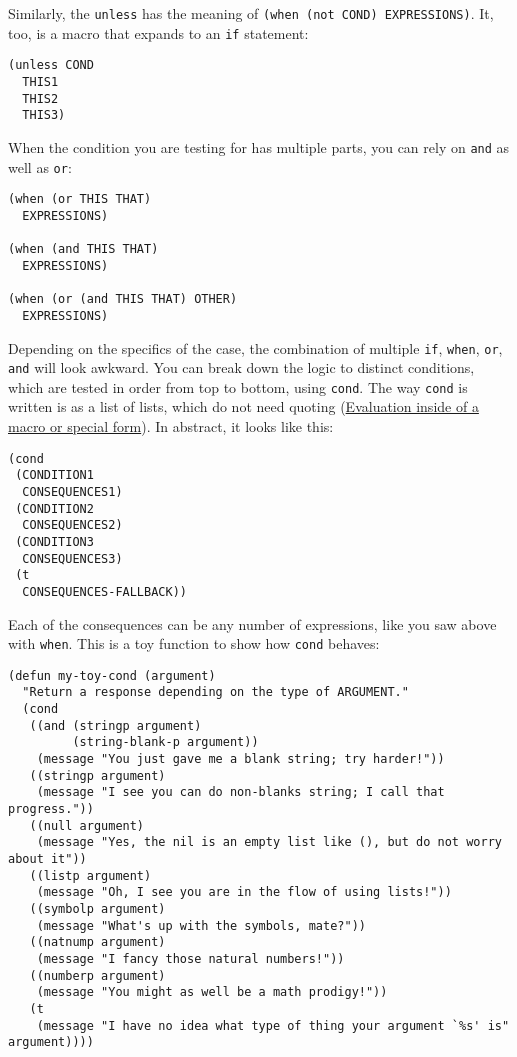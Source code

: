 \documentclass[11pt]{ctexart}
\begin{document}
Similarly, the \texttt{unless} has the meaning of \texttt{(when (not COND) EXPRESSIONS)}. It, too, is a macro that expands to an \texttt{if} statement:

\begin{verbatim}
(unless COND
  THIS1
  THIS2
  THIS3)
\end{verbatim}

When the condition you are testing for has multiple parts, you can rely on \texttt{and} as well as \texttt{or}:

\begin{verbatim}
(when (or THIS THAT)
  EXPRESSIONS)

(when (and THIS THAT)
  EXPRESSIONS)

(when (or (and THIS THAT) OTHER)
  EXPRESSIONS)
\end{verbatim}

Depending on the specifics of the case, the combination of multiple \texttt{if}, \texttt{when}, \texttt{or}, \texttt{and} will look awkward. You can break down the logic to distinct conditions, which are tested in order from top to bottom, using \texttt{cond}. The way \texttt{cond} is written is as a list of lists, which do not need quoting (\hyperref[sec:org61e1a1b]{Evaluation inside of a macro or special form}). In abstract, it looks like this:

\begin{verbatim}
(cond
 (CONDITION1
  CONSEQUENCES1)
 (CONDITION2
  CONSEQUENCES2)
 (CONDITION3
  CONSEQUENCES3)
 (t
  CONSEQUENCES-FALLBACK))
\end{verbatim}

Each of the consequences can be any number of expressions, like you saw above with \texttt{when}. This is a toy function to show how \texttt{cond} behaves:

\begin{verbatim}
(defun my-toy-cond (argument)
  "Return a response depending on the type of ARGUMENT."
  (cond
   ((and (stringp argument)
         (string-blank-p argument))
    (message "You just gave me a blank string; try harder!"))
   ((stringp argument)
    (message "I see you can do non-blanks string; I call that progress."))
   ((null argument)
    (message "Yes, the nil is an empty list like (), but do not worry about it"))
   ((listp argument)
    (message "Oh, I see you are in the flow of using lists!"))
   ((symbolp argument)
    (message "What's up with the symbols, mate?"))
   ((natnump argument)
    (message "I fancy those natural numbers!"))
   ((numberp argument)
    (message "You might as well be a math prodigy!"))
   (t
    (message "I have no idea what type of thing your argument `%s' is" argument))))
\end{verbatim}
\end{document}
